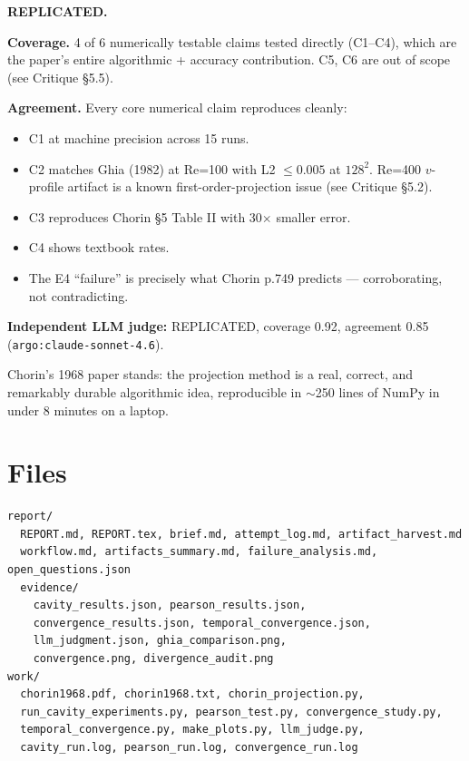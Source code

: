 \documentclass[11pt]{article}
\begin{document}
\textbf{REPLICATED.}

\textbf{Coverage.} 4 of 6 numerically testable claims tested directly (C1--C4), which are the paper's entire algorithmic + accuracy contribution. C5, C6 are out of scope (see Critique \S 5.5).

\textbf{Agreement.} Every core numerical claim reproduces cleanly:
\begin{itemize}
    \item C1 at machine precision across 15 runs.
    \item C2 matches Ghia (1982) at Re=100 with L2 $\le 0.005$ at $128^2$. Re=400 $v$-profile artifact is a known first-order-projection issue (see Critique \S 5.2).
    \item C3 reproduces Chorin \S 5 Table II with 30$\times$ smaller error.
    \item C4 shows textbook rates.
    \item The E4 ``failure'' is precisely what Chorin p.749 predicts --- corroborating, not contradicting.
\end{itemize}

\textbf{Independent LLM judge:} REPLICATED, coverage 0.92, agreement 0.85 (\texttt{argo:claude-sonnet-4.6}).

Chorin's 1968 paper stands: the projection method is a real, correct, and remarkably durable algorithmic idea, reproducible in $\sim$250 lines of NumPy in under 8 minutes on a laptop.

\section{Files}

\begin{lstlisting}
report/
  REPORT.md, REPORT.tex, brief.md, attempt_log.md, artifact_harvest.md
  workflow.md, artifacts_summary.md, failure_analysis.md, open_questions.json
  evidence/
    cavity_results.json, pearson_results.json,
    convergence_results.json, temporal_convergence.json,
    llm_judgment.json, ghia_comparison.png,
    convergence.png, divergence_audit.png
work/
  chorin1968.pdf, chorin1968.txt, chorin_projection.py,
  run_cavity_experiments.py, pearson_test.py, convergence_study.py,
  temporal_convergence.py, make_plots.py, llm_judge.py,
  cavity_run.log, pearson_run.log, convergence_run.log
\end{lstlisting}
\end{document}
